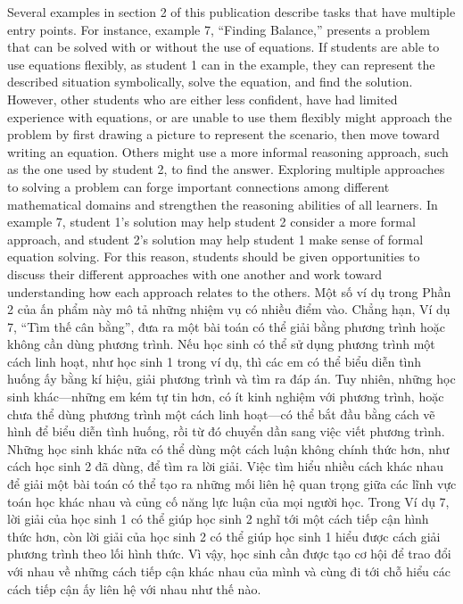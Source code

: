 \documentclass[
  10pt,
  a4paper,
  landscape,
  twoside,
  openany
]{scrbook}
\newcommand{\EN}[1]{#1}
\newcommand{\VI}[1]{#1}
\newcommand{\NOTE}[1]{#1}
\newcounter{example}
\begin{document}
\TriPara
{
\EN{Several examples in section 2 of this publication describe tasks that have multiple entry points. For instance, example 7, ``Finding Balance,'' presents a problem that can be solved with or without the use of equations. If students are able to use equations flexibly, as student 1 can in the example, they can represent the described situation symbolically, solve the equation, and find the solution. However, other students who are either less confident, have had limited experience with equations, or are unable to use them flexibly might approach the problem by first drawing a picture to represent the scenario, then move toward writing an equation. Others might use a more informal reasoning approach, such as the one used by student 2, to find the answer. Exploring multiple approaches to solving a problem can forge important connections among different mathematical domains and strengthen the reasoning abilities of all learners. In example 7, student 1's solution may help student 2 consider a more formal approach, and student 2's solution may help student 1 make sense of formal equation solving. For this reason, students should be given opportunities to discuss their different approaches with one another and work toward understanding how each approach relates to the others.}
}
{
\VI{Một số ví dụ trong Phần 2 của ấn phẩm này mô tả những nhiệm vụ có nhiều điểm vào. Chẳng hạn, Ví dụ 7, ``Tìm thế cân bằng'', đưa ra một bài toán có thể giải bằng phương trình hoặc không cần dùng phương trình. Nếu học sinh có thể sử dụng phương trình một cách linh hoạt, như học sinh 1 trong ví dụ, thì các em có thể biểu diễn tình huống ấy bằng kí hiệu, giải phương trình và tìm ra đáp án. Tuy nhiên, những học sinh khác---những em kém tự tin hơn, có ít kinh nghiệm với phương trình, hoặc chưa thể dùng phương trình một cách linh hoạt---có thể bắt đầu bằng cách vẽ hình để biểu diễn tình huống, rồi từ đó chuyển dần sang việc viết phương trình. Những học sinh khác nữa có thể dùng một cách luận không chính thức hơn, như cách học sinh 2 đã dùng, để tìm ra lời giải. Việc tìm hiểu nhiều cách khác nhau để giải một bài toán có thể tạo ra những mối liên hệ quan trọng giữa các lĩnh vực toán học khác nhau và củng cố năng lực luận của mọi người học. Trong Ví dụ 7, lời giải của học sinh 1 có thể giúp học sinh 2 nghĩ tới một cách tiếp cận hình thức hơn, còn lời giải của học sinh 2 có thể giúp học sinh 1 hiểu được cách giải phương trình theo lối hình thức. Vì vậy, học sinh cần được tạo cơ hội để trao đổi với nhau về những cách tiếp cận khác nhau của mình và cùng đi tới chỗ hiểu các cách tiếp cận ấy liên hệ với nhau như thế nào.}
}
{
\NOTE{}
}
\end{document}

